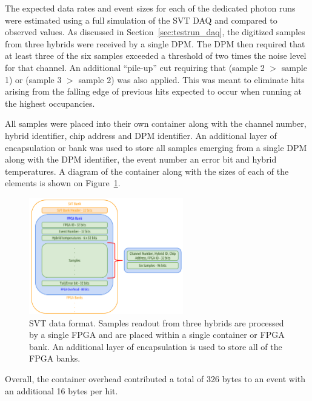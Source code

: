 
%
%

The expected data rates and event sizes for each of the dedicated photon runs
were estimated using a full simulation of the SVT DAQ and compared to observed
values. As discussed in Section~\ref{sec:testrun_daq}, the digitized samples
from three hybrids were received by a single DPM.  The DPM then required that
at least three of the six samples exceeded a threshold of two times the noise
level for that channel.  An additional ``pile-up'' cut requiring that 
(sample 2 $>$ sample 1) or (sample 3 $>$ sample 2) was also applied. This was
meant to eliminate hits arising from the falling edge of previous hits expected
to occur when running at the highest occupancies.

All samples were placed into their own container along with the 
channel number, hybrid identifier, chip address and DPM identifier. An 
additional layer of encapsulation or bank was used to store all samples 
emerging from a single DPM along with the DPM identifier, the event number
an error bit and hybrid temperatures. A diagram of the container along with
the sizes of each of the elements is shown on Figure~\ref{fig:data_format}.
\begin{figure}[ht]
    \begin{center}
    	\includegraphics[width=0.60\textwidth]{test2012/svtperformance/daq/svt_data_format.pdf}
        \caption{
                    SVT data format. Samples readout from three hybrids are 
                    processed by a single FPGA and are placed within a single
                    container or FPGA bank.  An additional layer of 
                    encapsulation is used to store all of the FPGA banks.
                 } 
	\label{fig:data_format}
    \end{center}
\end{figure}
Overall, the container overhead contributed a total of 326 bytes to an event
with an additional 16 bytes per hit.

